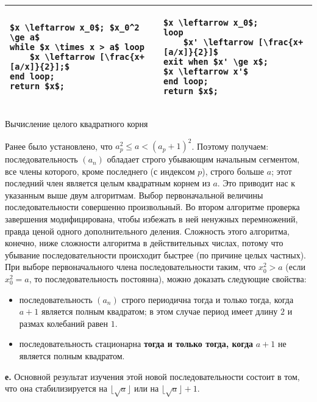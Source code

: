\documentclass{mai_book}
\begin{document}
\begin{table}[]
\centering
\begin{tabular}{|l|l|}
\hline
{\begin{lstlisting}[frame=none, mathescape=true]
$x \leftarrow x_0$; $x_0^2 \ge a$
while $x \times x > a$ loop
	$x \leftarrow [\frac{x+[a/x]}{2}];$
end loop;
return $x$;
\end{lstlisting}} & {\begin{lstlisting}[frame=none, mathescape=true]
$x \leftarrow x_0$;
loop
	$x' \leftarrow [\frac{x+[a/x]}{2}]$
exit when $x' \ge x$;
$x \leftarrow x'$
end loop;
return $x$;
\end{lstlisting}} \\ \hline
\end{tabular}
\end{table}
\begin{center}
Вычисление целого квадратного корня
\end{center}
Ранее было установлено, что $a^{2}_{p} \leqslant a < (a_{p} + 1)^{2}$. Поэтому получаем: последовательность $(a_{n})$ обладает строго убывающим начальным сегментом, все члены которого, кроме последнего (с индексом $p$), строго больше $a$; этот последний член является целым квадратным корнем из $a$. Это приводит нас к указанным выше двум алгоритмам. Выбор первоначальной величины последовательности совершенно произвольный. Во втором алгоритме проверка завершения модифицирована, чтобы избежать в ней ненужных перемножений, правда ценой одного дополнительного деления. Сложность этого алгоритма, конечно, ниже сложности алгоритма в действительных числах, потому что убывание последовательности происходит быстрее (по причине целых частных). При выборе первоначального члена последовательности таким, что $x^{2}_{0} > a$ (если $x^{2}_{0} = a$, то последовательность постоянна), можно доказать следующие свойства:
\begin{itemize}
\item последовательность $(a_{n})$ строго периодична тогда и только тогда, когда $a + 1$ является полным квадратом; в этом случае период имеет длину $2$ и размах колебаний равен $1$.
\item последовательность стационарна \textbf{тогда и только тогда, когда} $a + 1$ не является полным квадратом.
\end{itemize}

\textbf{е.} Основной результат изучения этой новой последовательности состоит в том, что она стабилизируется на $\lfloor \sqrt{a} \rfloor$ или на $\lfloor \sqrt{a} \rfloor + 1$.
\end{document}
